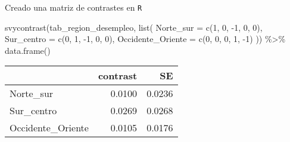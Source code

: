 \documentclass[
  ignorenonframetext,
]{beamer}
\newenvironment{Shaded}{\begin{snugshade}}{\end{snugshade}}
\newcommand{\AttributeTok}[1]{\textcolor[rgb]{0.77,0.63,0.00}{#1}}
\newcommand{\DecValTok}[1]{\textcolor[rgb]{0.00,0.00,0.81}{#1}}
\newcommand{\FunctionTok}[1]{\textcolor[rgb]{0.00,0.00,0.00}{#1}}
\newcommand{\NormalTok}[1]{#1}
\newcommand{\SpecialCharTok}[1]{\textcolor[rgb]{0.00,0.00,0.00}{#1}}
\begin{document}
\begin{frame}[fragile]{Creado una matriz de contrastes en \texttt{R}}
\protect\hypertarget{creado-una-matriz-de-contrastes-en-r}{}
\scriptsize

\begin{Shaded}
\begin{Highlighting}[]
\FunctionTok{svycontrast}\NormalTok{(tab\_region\_desempleo, }\FunctionTok{list}\NormalTok{(}
           \AttributeTok{Norte\_sur =} \FunctionTok{c}\NormalTok{(}\DecValTok{1}\NormalTok{, }\DecValTok{0}\NormalTok{, }\SpecialCharTok{{-}}\DecValTok{1}\NormalTok{, }\DecValTok{0}\NormalTok{, }\DecValTok{0}\NormalTok{),}
          \AttributeTok{Sur\_centro =} \FunctionTok{c}\NormalTok{(}\DecValTok{0}\NormalTok{, }\DecValTok{1}\NormalTok{, }\SpecialCharTok{{-}}\DecValTok{1}\NormalTok{, }\DecValTok{0}\NormalTok{, }\DecValTok{0}\NormalTok{),}
   \AttributeTok{Occidente\_Oriente =} \FunctionTok{c}\NormalTok{(}\DecValTok{0}\NormalTok{, }\DecValTok{0}\NormalTok{, }\DecValTok{0}\NormalTok{, }\DecValTok{1}\NormalTok{, }\SpecialCharTok{{-}}\DecValTok{1}\NormalTok{)}
\NormalTok{            )) }\SpecialCharTok{\%\textgreater{}\%} \FunctionTok{data.frame}\NormalTok{()}
\end{Highlighting}
\end{Shaded}

\begin{tabular}{l|r|r}
\hline
  & contrast & SE\\
\hline
Norte\_sur & 0.0100 & 0.0236\\
\hline
Sur\_centro & 0.0269 & 0.0268\\
\hline
Occidente\_Oriente & 0.0105 & 0.0176\\
\hline
\end{tabular}
\end{frame}
\end{document}
